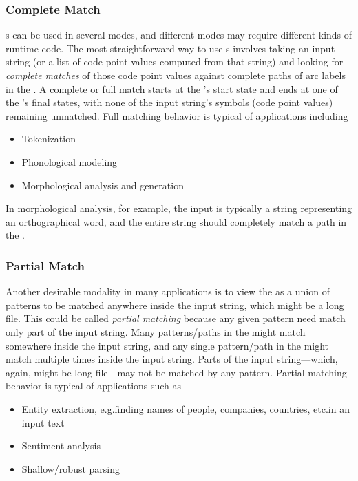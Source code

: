 \subsubsection{Complete Match}

\fsm{}s can be used in several modes, and different modes may require different kinds of runtime
code.  The most straightforward way to use \fsm{}s involves taking an input string (or a
list of code point values computed from that string) and looking for \emph{complete
matches} of those code point values against complete paths of arc labels in the \fsm{}.  A
complete or full match starts at the \fsm{}'s start state and ends at one of the \fsm{}'s final states, with none of
the input string's symbols (code point values) remaining unmatched.  Full matching
behavior is typical of applications including

\begin{itemize}
\item
Tokenization
\item
Phonological modeling
\item
Morphological analysis and generation
\end{itemize}

\noindent
In morphological analysis, for example, the input is typically a string representing an
orthographical word, and the entire string should completely match a path in the \fsm{}.

\subsubsection{Partial Match}

Another desirable modality in many applications is to view the \fsm{} as a union of patterns to be
matched anywhere inside the input string, which might be a long file.  This could be called
\emph{partial matching} because any given pattern need match only part of the input string.  Many
patterns/paths in the \fsm{} might match somewhere inside the input string, and any single pattern/path
in the \fsm{} might match multiple times inside the input string.  Parts of the input string---which,
again, might be long file---may not be matched by any pattern.  Partial matching behavior is typical of
applications such as

\begin{itemize}
\item
Entity extraction, e.g.\@ finding names of people, companies, countries, etc.\@ in an
input text
\item
Sentiment analysis
\item
Shallow/robust parsing
\end{itemize}


